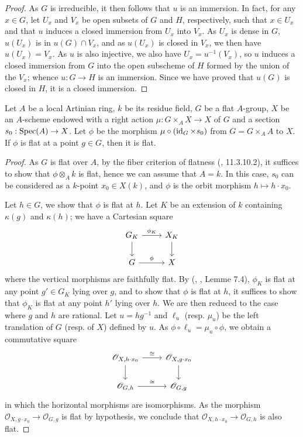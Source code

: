 \begin{proof}
As $G$ is irreducible, it then follows that $u$ is an immersion. In fact, for any $x\in G$, let $U_x$ and $V_x$ be open subsets of $G$ and $H$, respectively, such that $x\in U_x$ and that $u$ induces a closed immersion from $U_x$ into $V_x$. As $U_x$ is dense in $G$, $u(U_x)$ is in $u(G)\cap V_x$, and as $u(U_x)$ is closed in $V_x$, we then have $u(U_x)=V_x$. As $u$ is also injective, we also have $U_x=u^{-1}(V_x)$, so $u$ induces a closed immersion from $G$ into the open subscheme of $H$ formed by the union of the $V_x$; whence $u:G\to H$ is an immersion. Since we have proved that $u(G)$ is closed in $H$, it is a closed immersion. 
\end{proof}

\begin{lemma}\label{scheme A-group action orbit map flat iff at point}
Let $A$ be a local Artinian ring, $k$ be its residue field, $G$ be a flat $A$-group, $X$ be an $A$-scheme endowed with a right action $\mu:G\times_AX\to X$ of $G$ and a section $s_0:\mathrm{Spec}(A)\to X$. Let $\phi$ be the morphism $\mu\circ(\operatorname{id}_G\times s_0)$ from $G=G\times_AA$ to $X$. If $\phi$ is flat at a point $g\in G$, then it is flat.
\end{lemma}
\begin{proof}
As $G$ is flat over $A$, by the fiber criterion of flatness (\cite{EGA4-3}, 11.3.10.2), it suffices to show that $\phi\otimes_Ak$ is flat, hence we can assume that $A=k$. In this case, $s_0$ can be considered as a $k$-point $x_0\in X(k)$, and $\phi$ is the orbit morphism $h\mapsto h\cdot x_0$.\par
Let $h\in G$, we show that $\phi$ is flat at $h$. Let $K$ be an extension of $k$ containing $\kappa(g)$ and $\kappa(h)$; we have a Cartesian square
\[\begin{tikzcd}
G_K\ar[r,"\phi_K"]\ar[d]&X_K\ar[d]\\
G\ar[r,"\phi"]&X
\end{tikzcd}\]
where the vertical morphisms are faithfully flat. By (\cite{SGA3-1}, , Lemme 7.4), $\phi_K$ is flat at any point $g'\in G_K$ lying over $g$, and to show that $\phi$ is flat at $h$, it suffices to show that $\phi_K$ is flat at any point $h'$ lying over $h$. We are then reduced to the case where $g$ and $h$ are rational. Let $u=hg^{-1}$ and $\ell_u$ (resp. $\mu_u$) be the left translation of $G$ (resp. of $X$) defined by $u$. As $\phi\circ\ell_u=\mu_u\circ\phi$, we obtain a commutative square
\[\begin{tikzcd}
\mathscr{O}_{X,h\cdot x_0}\ar[r,"\cong"]\ar[d]&\mathscr{O}_{X,g\cdot x_0}\ar[d]\\
\mathscr{O}_{G,h}\ar[r,"\cong"]&\mathscr{O}_{G,g}
\end{tikzcd}\]
in which the horizontal morphisms are isomorphisms. As the morphism $\mathscr{O}_{X,g\cdot x_0}\to\mathscr{O}_{G,g}$ is flat by hypothesis, we conclude that $\mathscr{O}_{X,h\cdot x_0}\to\mathscr{O}_{G,h}$ is also flat.
\end{proof}

